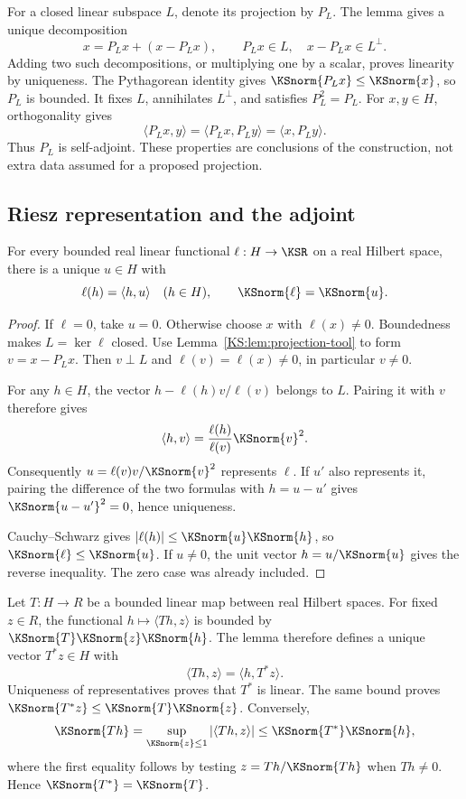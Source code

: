 \documentclass[11pt,oneside,openany]{book}
\numberwithin{equation}{section}
\begin{document}
For a closed linear subspace \(L\), denote its projection by \(P_L\). The lemma gives a unique decomposition
\[
 x=P_Lx+(x-P_Lx),\qquad P_Lx\in L,\quad x-P_Lx\in L^\perp.
\]
Adding two such decompositions, or multiplying one by a scalar, proves linearity by uniqueness. The Pythagorean identity gives \(\KSnorm{P_Lx}\le\KSnorm{x}\), so \(P_L\) is bounded. It fixes \(L\), annihilates \(L^\perp\), and satisfies \(P_L^2=P_L\). For \(x,y\in H\), orthogonality gives
\[
 \langle P_Lx,y\rangle=\langle P_Lx,P_Ly\rangle
 =\langle x,P_Ly\rangle.
\]
Thus \(P_L\) is self-adjoint. These properties are conclusions of the construction, not extra data assumed for a proposed projection.

\subsection{Riesz representation and the adjoint}
\begin{KSlemma}\label{KS:lem:riesz-tool}
For every bounded real linear functional \(\ell:H\to\KSR\) on a real Hilbert space, there is a unique \(u\in H\) with
\[
 \ell(h)=\langle h,u\rangle\quad(h\in H),\qquad \KSnorm{\ell}=\KSnorm{u}.
\]
\end{KSlemma}
\begin{proof}
If \(\ell=0\), take \(u=0\). Otherwise choose \(x\) with \(\ell(x)\ne0\). Boundedness makes \(L=\ker\ell\) closed. Use Lemma~\ref{KS:lem:projection-tool} to form \(v=x-P_Lx\). Then \(v\perp L\) and \(\ell(v)=\ell(x)\ne0\), in particular \(v\ne0\).

For any \(h\in H\), the vector \(h-\ell(h)v/\ell(v)\) belongs to \(L\). Pairing it with \(v\) therefore gives
\[
 \langle h,v\rangle=\frac{\ell(h)}{\ell(v)}\KSnorm{v}^2.
\]
Consequently \(u=\ell(v)v/\KSnorm{v}^2\) represents \(\ell\). If \(u'\) also represents it, pairing the difference of the two formulas with \(h=u-u'\) gives \(\KSnorm{u-u'}^2=0\), hence uniqueness.

Cauchy--Schwarz gives \(|\ell(h)|\le\KSnorm{u}\KSnorm{h}\), so \(\KSnorm{\ell}\le\KSnorm{u}\). If \(u\ne0\), the unit vector \(h=u/\KSnorm{u}\) gives the reverse inequality. The zero case was already included.
\end{proof}

Let \(T:H\to R\) be a bounded linear map between real Hilbert spaces. For fixed \(z\in R\), the functional \(h\mapsto\langle Th,z\rangle\) is bounded by \(\KSnorm{T}\KSnorm{z}\KSnorm{h}\). The lemma therefore defines a unique vector \(T^*z\in H\) with
\[
 \langle Th,z\rangle=\langle h,T^*z\rangle.
\]
Uniqueness of representatives proves that \(T^*\) is linear. The same bound proves \(\KSnorm{T^*z}\le\KSnorm{T}\KSnorm{z}\). Conversely,
\[
 \KSnorm{Th}=\sup_{\KSnorm{z}\le1}|\langle Th,z\rangle|
 \le\KSnorm{T^*}\KSnorm{h},
\]
where the first equality follows by testing \(z=Th/\KSnorm{Th}\) when \(Th\ne0\). Hence \(\KSnorm{T^*}=\KSnorm{T}\).
\end{document}
